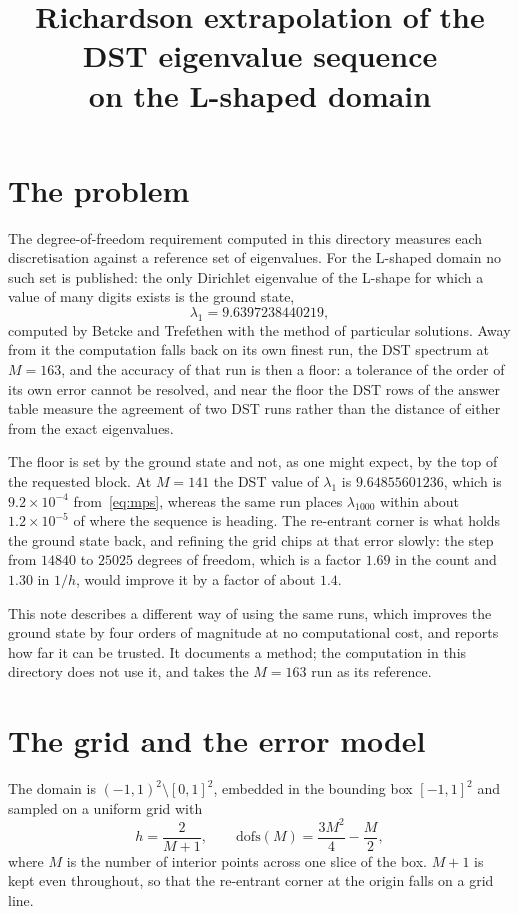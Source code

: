 \documentclass[11pt,a4paper]{article}
\title{Richardson extrapolation of the DST eigenvalue sequence\\
       on the L-shaped domain}
\author{}
\date{}
\newcommand{\dofs}{\mathrm{dofs}}
\begin{document}
\maketitle

\section{The problem}

The degree-of-freedom requirement computed in this directory measures each
discretisation against a reference set of eigenvalues. For the L-shaped domain
no such set is published: the only Dirichlet eigenvalue of the L-shape for which
a value of many digits exists is the ground state,
\begin{equation}
  \lambda_1 = 9.6397238440219,
  \label{eq:mps}
\end{equation}
computed by Betcke and Trefethen with the method of particular solutions. Away
from it the computation falls back on its own finest run, the DST spectrum at
$M = 163$, and the accuracy of that run is then a floor: a tolerance of the
order of its own error cannot be resolved, and near the floor the DST rows of
the answer table measure the agreement of two DST runs rather than the distance
of either from the exact eigenvalues.

The floor is set by the ground state and not, as one might expect, by the top of
the requested block. At $M = 141$ the DST value of $\lambda_1$ is
$9.64855601236$, which is $9.2 \times 10^{-4}$ from~\eqref{eq:mps}, whereas the
same run places $\lambda_{1000}$ within about $1.2 \times 10^{-5}$ of where the
sequence is heading. The re-entrant corner is what holds the ground state back,
and refining the grid chips at that error slowly: the step from $14840$ to
$25025$ degrees of freedom, which is a factor $1.69$ in the count and $1.30$ in
$1/h$, would improve it by a factor of about $1.4$.

This note describes a different way of using the same runs, which improves the
ground state by four orders of magnitude at no computational cost, and reports
how far it can be trusted. It documents a method; the computation in this
directory does not use it, and takes the $M = 163$ run as its reference.

\section{The grid and the error model}

The domain is $(-1,1)^2 \setminus [0,1]^2$, embedded in the bounding box
$[-1,1]^2$ and sampled on a uniform grid with
\begin{equation}
  h = \frac{2}{M+1},
  \qquad
  \dofs(M) = \frac{3M^2}{4} - \frac{M}{2},
\end{equation}
where $M$ is the number of interior points across one slice of the box. $M+1$ is
kept even throughout, so that the re-entrant corner at the origin falls on a grid
line.
\end{document}
